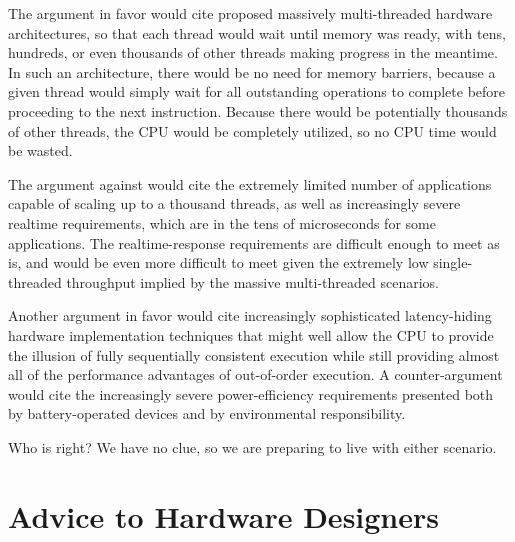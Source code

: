 The argument in favor would cite proposed massively multi-threaded hardware
architectures, so that each thread would wait until memory was ready,
with tens, hundreds, or even thousands of other threads making progress
in the meantime.
In such an architecture, there would be no need for memory barriers,
because a given thread would simply wait for all outstanding operations
to complete before proceeding to the next instruction.
Because there would be potentially thousands of other threads, the
CPU would be completely utilized, so no CPU time would be wasted.

The argument against would cite the extremely limited number of applications
capable of scaling up to a thousand threads, as well as increasingly
severe realtime requirements, which are in the tens of microseconds
for some applications.
The realtime-response requirements are difficult enough to meet as is,
and would be even more difficult to meet given the extremely low
single-threaded throughput implied by the massive multi-threaded
scenarios.

Another argument in favor would cite increasingly sophisticated
latency-hiding hardware implementation techniques that might well allow
the CPU to provide the illusion of fully sequentially consistent
execution while still providing almost all of the performance advantages
of out-of-order execution.
A counter-argument would cite the increasingly severe power-efficiency
requirements presented both by battery-operated devices and by
environmental responsibility.

Who is right?
We have no clue, so we are preparing to live with either scenario.

\section{Advice to Hardware Designers}
\label{sec:app:whymb:Advice to Hardware Designers}

